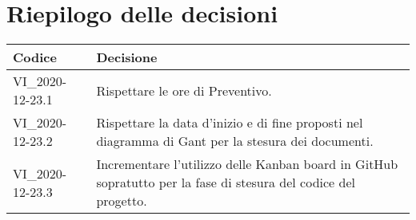 \section{Riepilogo delle decisioni}
\setcounter{table}{-1}
{

\centering
\renewcommand{\arraystretch}{1.5}
\begin{longtable}{>{\centering}p{} >{}p{}}
\rowcolor{azzurro1}
\textbf{Codice} &
\centerline{\textbf{Decisione}}\\
\endhead

VI{\_}2020-12-23.1 & Rispettare le ore di Preventivo.\\
VI{\_}2020-12-23.2 & Rispettare la data d'inizio e di fine proposti nel diagramma di Gant per la stesura dei documenti.\\
VI{\_}2020-12-23.3 & Incrementare l'utilizzo delle Kanban board in GitHub sopratutto per la fase di stesura del codice del progetto.\\
\end{longtable}
}
